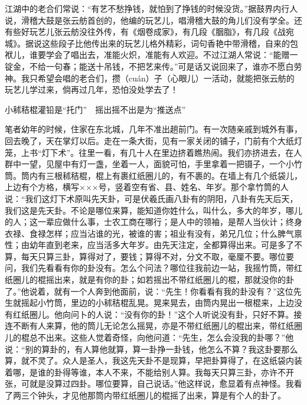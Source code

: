 \documentclass[12pt,UTF8]{ctexbook}
\begin{document}
江湖中的老合们常说：“有艺不愁挣钱，就怕到了挣钱的时候没货。”据鼓界内行人说，滑稽大鼓是张云舫首创的，他编的玩艺儿，唱滑稽大鼓的角儿们没有学全。还有些好玩艺儿张云舫没往外传，有《烟卷成家》，有几段《胭脂》，有几段《战宛城》。据说这些段子比他传出来的玩艺儿格外精彩，词句香艳中带滑稽，自来的包袱儿，谁要学会了唱出去，准能火炽，准能有人欢迎。不过江湖人常说：“能赠一锭金，不给一句春；能送十吊钱，不把艺来传。”可是话又说回来了，谁亦不愿白劳神。我只希望会唱的老合们，攒（cuán）子（心眼儿）一活动，就能把张云舫的玩艺儿学过来，倘再过几年，恐怕没处学去了！





小秫秸棍灌铅是“托门”　摇出摇不出是为“推送点”


笔者幼年的时候，住家在东北城，几年不准出趟前门。有一次随亲戚到城外有事，回去晚了，天在掌灯以后。走在一条大街，见有一家关闭的铺子，门前有个大纸灯笼，上书“灯下术”。往里一看，有几十人在里边挤着瞧热闹。我们亦挤进去，在人群中一望，见屋中有灯一盏，坐着一人，面貌可怕，手里拿着一把镊子，一个小竹筒。筒内有三根秫秸棍，棍上有裹红纸圈儿的，有不裹的。在墙上有几个纸袋儿，上边有个方格，横写×××号，竖着空有省、县、姓名、年岁。那个拿竹筒的人说：“我们这灯下术原叫先天卦，可是伏羲氏画八卦有的阴阳，八卦有先天后天，我们这是先天卦。不论是哪位来算，能知道你姓什么，叫什么，多大的年岁，哪儿的人；这一辈应做什么事，士农工商在哪行；是人中的领袖，是帮人当伙计；终身衣禄、食禄怎样；应当沾谁的光，被谁的害；祖业有没有，弟兄几位；什么脾气禀性；由幼年直到老来，应当活多大年岁。由先天注定，全都算得出来。可是多了不算，每天只算三卦，算得对了，要钱；算得不对，分文不取，毫厘不要。哪位要问，我们先看看有你的卦没有。怎么个问法？哪位往我前边一站，我摇竹筒，带红纸圈儿的棍摇出来，就是有你的卦；如若摇出不带红纸圈儿的棍，那就没你的卦了。”他说着，就有一个人奔到他面前，说：“先生！你看看有我的卦没有？”这位先生就摇起小竹筒，里边的小秫秸棍乱晃。晃来晃去，由筒内晃出一根棍来，上边没有红纸圈儿。他向问卜的人说：“没有你的卦！”这个人听说没有卦，只好不算。接连不断有人来算，他的筒儿无论怎么摇晃，亦是不带红纸圈儿的棍出来，带红纸圈儿的棍总不出来。这些人觉着奇怪，向他问道：“先生，怎么会没我的卦哪？”他说：“别的算卦的，有人算他就算，算一卦挣一卦钱，他怎么不算？我这卦要那么算，就不灵了。众人是圣人，我这先天卦不是现算，早把卦算得了，在这纸袋内装着哪，是谁的卦得等谁，本人不来，不能给别人算。我每天只算三卦，亦许不开张，可就是没算过四卦。哪位要算，自己说话。”他这样说，愈显着有点神怪。我看了两三个钟头，才见他那筒内带红纸圈儿的棍摇了出来，算是有个人的卦了。
\end{document}
